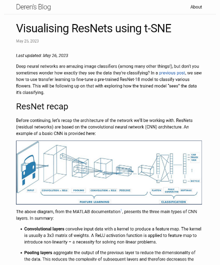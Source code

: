 \begin{figure}[!ht]
    \centering
    \includegraphics[width=\textwidth]{images/q1_sample_of_post_4.png}
\end{figure}

